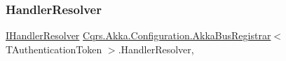 \subsubsection{\texorpdfstring{Handler\+Resolver}{HandlerResolver}}
{\footnotesize\ttfamily \hyperlink{interfaceCqrs_1_1Akka_1_1Configuration_1_1IHandlerResolver}{I\+Handler\+Resolver} \hyperlink{classCqrs_1_1Akka_1_1Configuration_1_1AkkaBusRegistrar}{Cqrs.\+Akka.\+Configuration.\+Akka\+Bus\+Registrar}$<$ T\+Authentication\+Token $>$.Handler\+Resolver\hspace{0.3cm}{\ttfamily [get]}, {\ttfamily [protected]}}

